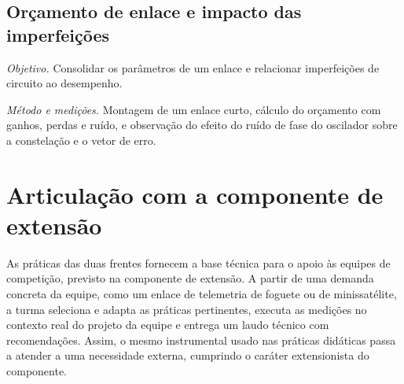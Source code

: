 \documentclass[11pt,a4paper]{article}
\newcommand{\pratica}[3]{%
  \subsection{#1}
  \textit{Objetivo.} #2

  \textit{Método e medições.} #3
  \vspace{0.3em}
}
\begin{document}
\pratica{Orçamento de enlace e impacto das imperfeições}
{Consolidar os parâmetros de um enlace e relacionar imperfeições de circuito ao desempenho.}
{Montagem de um enlace curto, cálculo do orçamento com ganhos, perdas e ruído, e observação do efeito do ruído de fase do oscilador sobre a constelação e o vetor de erro.}

\section{Articulação com a componente de extensão}

As práticas das duas frentes fornecem a base técnica para o apoio às equipes de competição, previsto na componente de extensão. A partir de uma demanda concreta da equipe, como um enlace de telemetria de foguete ou de minissatélite, a turma seleciona e adapta as práticas pertinentes, executa as medições no contexto real do projeto da equipe e entrega um laudo técnico com recomendações. Assim, o mesmo instrumental usado nas práticas didáticas passa a atender a uma necessidade externa, cumprindo o caráter extensionista do componente.
\end{document}
